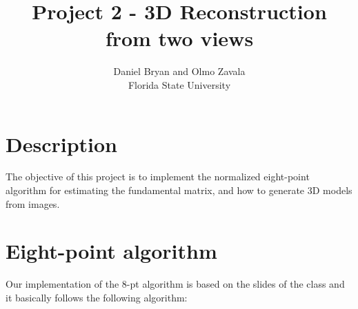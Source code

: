 \documentclass[a4paper,12pt]{article}
\title{Project 2 - 3D Reconstruction from two views}
\author{Daniel Bryan and Olmo Zavala\\Florida State University}
\begin{document}
\maketitle

\section{Description}
The objective of this project is to implement the normalized eight-point algorithm 
for estimating the fundamental matrix, and how to generate 3D models from images. \\

\section{Eight-point algorithm}
Our implementation of the 8-pt algorithm is based on the slides of the class and it basically
follows the following algorithm:
\end{document}
